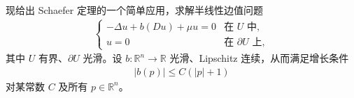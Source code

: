 \documentclass[../../main.tex]{subfiles}
\begin{document}
\begin{example}\label{example:ch09-2-2-拟线性椭圆}
现给出 Schaefer 定理的一个简单应用，求解半线性边值问题
\begin{align}
\begin{cases}
-\Delta u+b(Du)+\mu u=0&\text{在 }U\text{ 中},\\
u=0&\text{在 }\partial U\text{ 上},
\end{cases}\label{align:ch09-2-eq21}
\end{align}
其中 $U$ 有界、$\partial U$ 光滑。设 $b:\mathbb{R}^n\to\mathbb{R}$ 光滑、Lipschitz 连续，从而满足增长条件
\begin{align}
|b(p)|\leqslant C(|p|+1)\label{align:ch09-2-eq22}
\end{align}
对某常数 $C$ 及所有 $p\in\mathbb{R}^n$。


\end{example}
\end{document}
